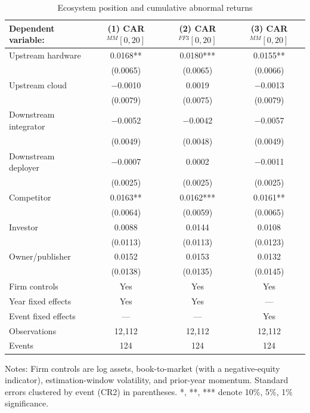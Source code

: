 \documentclass[review,12pt,authoryear]{elsarticle}
\begin{document}
\begin{table}[t!]
\centering
\begin{threeparttable}
\caption{Ecosystem position and cumulative abnormal returns}\label{tab:baseline}
\small
\begin{tabular}{lccc}
\toprule
Dependent variable: & (1) CAR$^{MM}[0,20]$ & (2) CAR$^{FF3}[0,20]$ & (3) CAR$^{MM}[0,20]$ \\
\midrule
Upstream hardware      & 0.0168** & 0.0180*** & 0.0155** \\
                       & (0.0065) & (0.0065)  & (0.0066) \\
Upstream cloud         & $-$0.0010 & 0.0019   & $-$0.0013 \\
                       & (0.0079) & (0.0075)  & (0.0079) \\
Downstream integrator  & $-$0.0052 & $-$0.0042 & $-$0.0057 \\
                       & (0.0049) & (0.0048)  & (0.0049) \\
Downstream deployer    & $-$0.0007 & 0.0002   & $-$0.0011 \\
                       & (0.0025) & (0.0025)  & (0.0025) \\
Competitor             & 0.0163** & 0.0162*** & 0.0161** \\
                       & (0.0064) & (0.0059)  & (0.0065) \\
Investor               & 0.0088   & 0.0144    & 0.0108 \\
                       & (0.0113) & (0.0113)  & (0.0123) \\
Owner/publisher        & 0.0152   & 0.0153    & 0.0132 \\
                       & (0.0138) & (0.0135)  & (0.0145) \\
\midrule
Firm controls          & Yes & Yes & Yes \\
Year fixed effects     & Yes & Yes & --- \\
Event fixed effects    & --- & --- & Yes \\
Observations           & 12{,}112 & 12{,}112 & 12{,}112 \\
Events                 & 124 & 124 & 124 \\
\bottomrule
\end{tabular}
\begin{tablenotes}\footnotesize
\item Notes: Firm controls are log assets, book-to-market (with a
negative-equity indicator), estimation-window volatility, and prior-year
momentum. Standard errors clustered by event (CR2) in parentheses.
*, **, *** denote 10\%, 5\%, 1\% significance.
\end{tablenotes}
\end{threeparttable}
\end{table}
\end{document}
